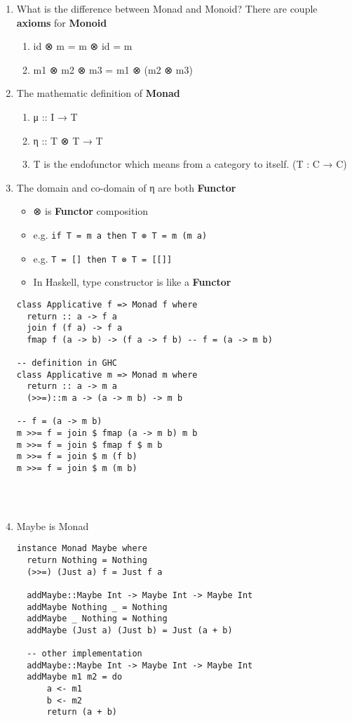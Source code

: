 \documentclass[11pt]{article}
\begin{document}
\begin{enumerate}
\item What is the difference between Monad and Monoid?
There are couple \textbf{axioms} for \textbf{Monoid}
\begin{enumerate}
\item id ⊗ m = m ⊗ id = m
\item m1 ⊗ m2 ⊗ m3 = m1 ⊗ (m2 ⊗ m3)
\end{enumerate}
\item The mathematic definition of \textbf{Monad}   
\begin{enumerate}
\item μ :: I → T
\item η :: T ⊗ T → T
\item T is the endofunctor which means from a category to itself. (T : C → C)
\end{enumerate}
\item The domain and co-domain of η are both \textbf{Functor}
\begin{itemize}
\item ⊗ is \textbf{Functor} composition
\item e.g. \texttt{if T = m a then T ⊗ T = m (m a)}
\item e.g. \texttt{T = [] then T ⊗ T = [[]]}
\item In Haskell, type constructor is like a \textbf{Functor}
\end{itemize}
\begin{verbatim}
class Applicative f => Monad f where
  return :: a -> f a
  join f (f a) -> f a
  fmap f (a -> b) -> (f a -> f b) -- f = (a -> m b)

-- definition in GHC
class Applicative m => Monad m where
  return :: a -> m a
  (>>=)::m a -> (a -> m b) -> m b

-- f = (a -> m b)
m >>= f = join $ fmap (a -> m b) m b
m >>= f = join $ fmap f $ m b
m >>= f = join $ m (f b)
m >>= f = join $ m (m b)




\end{verbatim}
\item Maybe is Monad
\begin{verbatim}
instance Monad Maybe where
  return Nothing = Nothing
  (>>=) (Just a) f = Just f a

  addMaybe::Maybe Int -> Maybe Int -> Maybe Int
  addMaybe Nothing _ = Nothing
  addMaybe _ Nothing = Nothing
  addMaybe (Just a) (Just b) = Just (a + b)

  -- other implementation
  addMaybe::Maybe Int -> Maybe Int -> Maybe Int
  addMaybe m1 m2 = do
	  a <- m1
	  b <- m2
	  return (a + b)
\end{verbatim}
\end{enumerate}
\end{document}
